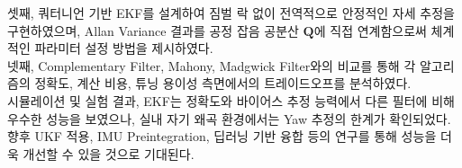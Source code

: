         셋째, 쿼터니언 기반 EKF를 설계하여 짐벌 락 없이 전역적으로 안정적인 자세 추정을 구현하였으며, Allan Variance 결과를 공정 잡음 공분산 $\mathbf{Q}$에 직접 연계함으로써 체계적인 파라미터 설정 방법을 제시하였다.\\
        
        넷째, Complementary Filter, Mahony, Madgwick Filter와의 비교를 통해 각 알고리즘의 정확도, 계산 비용, 튜닝 용이성 측면에서의 트레이드오프를 분석하였다.\\

        시뮬레이션 및 실험 결과, EKF는 정확도와 바이어스 추정 능력에서 다른 필터에 비해 우수한 성능을 보였으나, 실내 자기 왜곡 환경에서는 Yaw 추정의 한계가 확인되었다. 향후 UKF 적용, IMU Preintegration, 딥러닝 기반 융합 등의 연구를 통해 성능을 더욱 개선할 수 있을 것으로 기대된다.\\